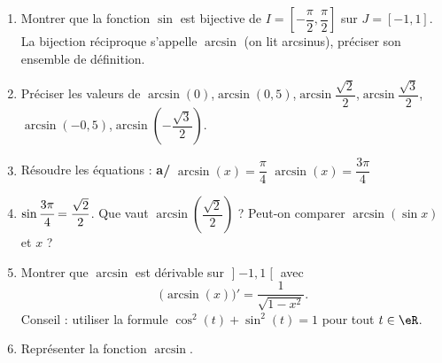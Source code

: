
\begin{exercice}\label{exostarterST-0010}

\begin{enumerate}
\item Montrer que la fonction $\sin$ est bijective de $I=[-\dfrac{\pi}2,\dfrac{\pi}2]$ sur $J=[-1,1]$. La bijection réciproque s'appelle $\arcsin$ (on lit arcsinus), préciser son ensemble de définition.
\item Préciser les valeurs de $\arcsin(0)$,\quad $\arcsin(0,5)$,\quad $\arcsin\dfrac{\sqrt2}2$,\quad $\arcsin\dfrac{\sqrt3}2$,\quad $\arcsin(-0,5)$,\quad $\arcsin(-\dfrac{\sqrt{3}}2)$.
\item Résoudre  les équations : {\bfseries  a/} $\arcsin (x) = \dfrac{\pi}{4}$    $\arcsin (x) = \dfrac{3\pi}{4}$
\item $\sin \cfrac{3\pi}4=\dfrac{\sqrt2}2$. Que vaut $\arcsin(\dfrac{\sqrt{2}}2)$ ? Peut-on comparer $\arcsin(\sin x)$ et $x$ ?
\item Montrer que $\arcsin$ est dérivable sur $\mathopen] -1 , 1 \mathclose[$ avec
			\begin{equation}
				\big( \arcsin(x) \big)'=\frac{1}{ \sqrt{1-x^2} }.
			\end{equation}
			Conseil : utiliser la formule $\cos^2(t)+\sin^2(t)=1$ pour tout $t\in\eR$.
\item Représenter la fonction $\arcsin$. 
\end{enumerate}


\end{exercice}
